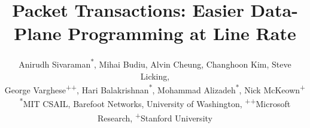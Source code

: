 \documentclass[letterpaper,twocolumn,10pt]{article}
\begin{document}
\date{}

\title{Packet Transactions: Easier Data-Plane Programming at Line Rate}
\author{
  \fontsize{10.7}{9.9}\rm Anirudh Sivaraman\textsuperscript{*}, Mihai Budiu\textsuperscript{\dag}, Alvin Cheung\textsuperscript{\ddag}, Changhoon Kim\textsuperscript{\dag}, Steve Licking\textsuperscript{\dag}, \\
  \fontsize{10.7}{9.9}\rm George Varghese\textsuperscript{++}, Hari Balakrishnan\textsuperscript{*}, Mohammad Alizadeh\textsuperscript{*}, Nick McKeown\textsuperscript{+}\\
\fontsize{10.7}{9.9}\selectfont \textsuperscript{*}MIT CSAIL, \textsuperscript{\dag}Barefoot Networks, \textsuperscript{\ddag}University of Washington, \textsuperscript{++}Microsoft Research, \textsuperscript{+}Stanford University
}

\maketitle







%



\balance
{\footnotesize 
}


\end{document}
